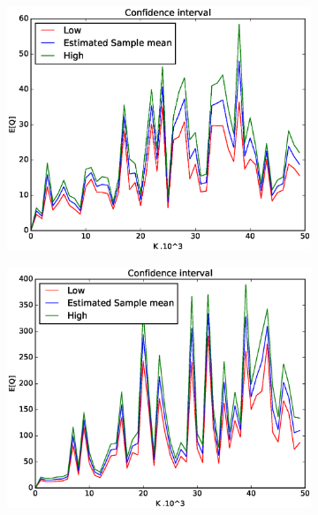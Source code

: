 \documentclass[a4paper]{article}
\begin{document}
\begin{figure}[H]
\begin{subfigure}{.5\textwidth}
  \centering
  \includegraphics[width=\linewidth]{../figures/SSTF_batch_mean_ci}
  \label{fig:sstfbm}
\end{subfigure}%
\begin{subfigure}{.5\textwidth}
  \centering
  \includegraphics[width=\linewidth]{../figures/ROS_batch_mean_ci}
  \label{fig:rosbm}
\end{subfigure}
\end{figure}
\end{document}
